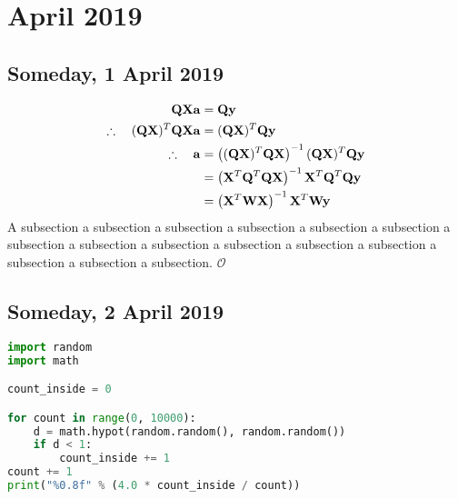 \chapter[2019 April]{April 2019}

\section[2019/04/01]{Someday, 1 April 2019}
\label{sec:20190401}

\lipsum
\begin{align}
  \mathbf{QX} \mathbf{a} & = \mathbf{Qy} \notag \\
  \therefore \quad (\mathbf{QX})^T \mathbf{QX} \mathbf{a} & = (\mathbf{QX})^T \mathbf{Qy} \notag \\
  \therefore \quad \mathbf{a} & = \left( (\mathbf{QX})^T \mathbf{QX} \right)^{-1} (\mathbf{QX})^T \mathbf{Qy} \notag \\
        & = \left( \mathbf{X}^T \mathbf{Q}^T \mathbf{QX} \right)^{-1} \mathbf{X}^T \mathbf{Q}^T \mathbf{Qy} \notag \\
        & = \left( \mathbf{X}^T \mathbf{W} \mathbf{X} \right)^{-1} \mathbf{X}^T \mathbf{W} \mathbf{y}
          \label{eqn:weightedleastsquares}
\end{align}
A subsection a subsection a subsection a subsection a subsection a
subsection a subsection a subsection a subsection a subsection a
subsection a subsection a subsection a subsection a subsection.
$\mathcal O$

\pendsign

\section[2019/04/02]{Someday, 2 April 2019}

\begin{lstlisting}[language=Python,title={Monte Carlo approximation of $\pi$}]
import random
import math

count_inside = 0

for count in range(0, 10000):
    d = math.hypot(random.random(), random.random())
    if d < 1:
        count_inside += 1
count += 1
print("%0.8f" % (4.0 * count_inside / count))
\end{lstlisting}

